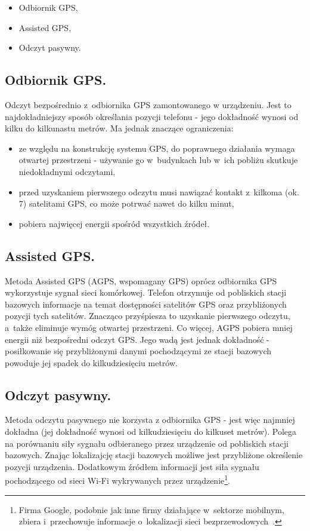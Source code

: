 \documentclass[a4paper,twocolumn,11pt]{article}
\begin{document}
\begin{itemize}
 \item Odbiornik GPS,
 \item Assisted GPS,
 \item Odczyt pasywny.
\end{itemize}


\subsection{Odbiornik GPS.}
 Odczyt bezpośrednio z~odbiornika GPS zamontowanego w urządzeniu.
 Jest to najdokładniejszy sposób określania pozycji telefonu - jego dokładność wynosi od kilku do kilkunastu metrów.
 Ma jednak znaczące ograniczenia:
 \begin{itemize}
  \item ze względu na konstrukcję systemu GPS, do poprawnego działania wymaga otwartej przestrzeni - używanie go w~budynkach lub w~ich pobliżu skutkuje niedokładnymi odczytami,
  \item przed uzyskaniem pierwszego odczytu musi nawiązać kontakt z~kilkoma (ok. 7) satelitami GPS, co może potrwać nawet do kilku minut,
  \item pobiera najwięcej energii spośród wszystkich źródeł.
 \end{itemize}


\subsection{Assisted GPS.}
 Metoda Assisted GPS (AGPS, wspomagany GPS) oprócz odbiornika GPS wykorzystuje sygnał sieci komórkowej.
 Telefon otrzymuje od pobliskich stacji bazowych informacje na temat dostępności satelitów GPS oraz przybliżonych pozycji tych satelitów.
 Znacząco przyśpiesza to uzyskanie pierwszego odczytu, a~także eliminuje wymóg otwartej przestrzeni.
 Co więcej, AGPS pobiera mniej energii niż bezpośredni odczyt GPS.
 Jego wadą jest jednak dokładność - posiłkowanie się przybliżonymi danymi pochodzącymi ze stacji bazowych powoduje jej spadek do kilkudziesięciu metrów.


\subsection{Odczyt pasywny.}
 Metoda odczytu pasywnego nie korzysta z odbiornika GPS - jest więc najmniej dokładna (jej dokładność wynosi od kilkudziesięciu do kilkuset metrów).
 Polega na porównaniu siły sygnału odbieranego przez urządzenie od pobliskich stacji bazowych.
 Znając lokalizajcję stacji bazowych możliwe jest przybliżone określenie pozycji urządzenia.
 Dodatkowym źródłem informacji jest siła sygnału pochodzącego od sieci Wi-Fi wykrywanych przez urządzenie\footnote{Firma Google, podobnie jak inne firmy działające w~sektorze mobilnym, zbiera i~przechowuje informacje o~lokalizacji sieci bezprzewodowych~\cite{wifi:loc}.}.\\
\end{document}
